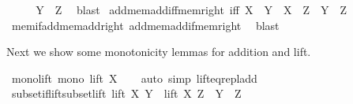 \begin{isabellebody}
\isanewline
\ \ \isamarkupfalse%
\ \isamarkupfalse%
\ {\isachardoublequoteopen}Y\ {\isasymin}\ Z{\isachardoublequoteclose}\ \isamarkupfalse%
\ blast\isanewline
{}\isamarkupfalse%
%
\endisatagproof
{\isafoldproof}%
%
\isadelimproof
\isanewline
%
\endisadelimproof
\isanewline
{}\isamarkupfalse%
\ add{\isacharunderscore}{\kern0pt}mem{\isacharunderscore}{\kern0pt}add{\isacharunderscore}{\kern0pt}iff{\isacharunderscore}{\kern0pt}mem{\isacharunderscore}{\kern0pt}right\ {\isacharbrackleft}{\kern0pt}iff{\isacharbrackright}{\kern0pt}{\isacharcolon}{\kern0pt}\ {\isachardoublequoteopen}X\ {\isacharplus}{\kern0pt}\ Y\ {\isasymin}\ X\ {\isacharplus}{\kern0pt}\ Z\ {\isasymlongleftrightarrow}\ Y\ {\isasymin}\ Z{\isachardoublequoteclose}\isanewline
%
\isadelimproof
\ \ %
\endisadelimproof
%
\isatagproof
{}\isamarkupfalse%
\ mem{\isacharunderscore}{\kern0pt}if{\isacharunderscore}{\kern0pt}add{\isacharunderscore}{\kern0pt}mem{\isacharunderscore}{\kern0pt}add{\isacharunderscore}{\kern0pt}right\ add{\isacharunderscore}{\kern0pt}mem{\isacharunderscore}{\kern0pt}add{\isacharunderscore}{\kern0pt}if{\isacharunderscore}{\kern0pt}mem{\isacharunderscore}{\kern0pt}right\ \isamarkupfalse%
\ blast%
\endisatagproof
{\isafoldproof}%
%
\isadelimproof
%
\endisadelimproof
%
\begin{isamarkuptext}%
Next we show some monotonicity lemmas for addition and lift.%
\end{isamarkuptext}\isamarkuptrue%
\isamarkupfalse%
\ mono{\isacharunderscore}{\kern0pt}lift{\isacharcolon}{\kern0pt}\ {\isachardoublequoteopen}mono\ {\isacharparenleft}{\kern0pt}lift\ X{\isacharparenright}{\kern0pt}{\isachardoublequoteclose}\isanewline
%
\isadelimproof
\ \ %
\endisadelimproof
%
\isatagproof
{}\isamarkupfalse%
\ {\isacharparenleft}{\kern0pt}auto\ simp{\isacharcolon}{\kern0pt}\ lift{\isacharunderscore}{\kern0pt}eq{\isacharunderscore}{\kern0pt}repl{\isacharunderscore}{\kern0pt}add{\isacharparenright}{\kern0pt}%
\endisatagproof
{\isafoldproof}%
%
\isadelimproof
\isanewline
%
\endisadelimproof
\isanewline
{}\isamarkupfalse%
\ subset{\isacharunderscore}{\kern0pt}if{\isacharunderscore}{\kern0pt}lift{\isacharunderscore}{\kern0pt}subset{\isacharunderscore}{\kern0pt}lift{\isacharcolon}{\kern0pt}\ {\isachardoublequoteopen}lift\ X\ Y\ {\isasymsubseteq}\ lift\ X\ Z\ {\isasymLongrightarrow}\ Y\ {\isasymsubseteq}\ Z{\isachardoublequoteclose}\isanewline
%
\isadelimproof
\ \ %
\endisadelimproof
%
\isatagproof

\end{isabellebody}
